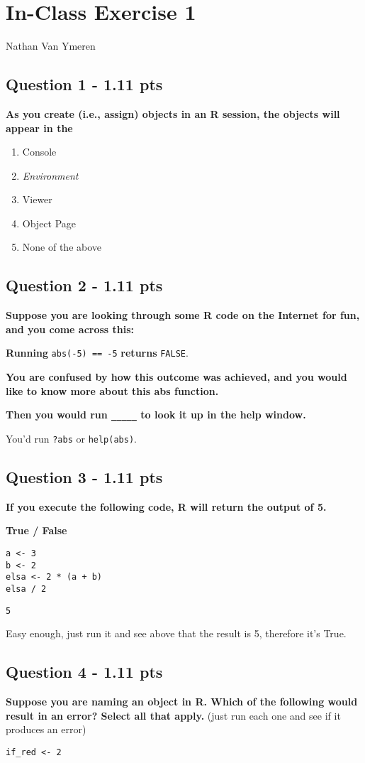 \documentclass[11pt]{article}
\author{Nathan Van Ymeren}
\date{\today}
\title{}
\begin{document}
\section*{In-Class Exercise 1}
\label{sec:org993d457}
Nathan Van Ymeren
\subsection*{Question 1 - 1.11 pts}
\label{sec:org1a52a24}
\textbf{As you create (i.e., assign) objects in an R session, the objects will appear in the}
\begin{enumerate}
\item Console
\item \emph{Environment}
\item Viewer
\item Object Page
\item None of the above
\end{enumerate}
\subsection*{Question 2 - 1.11 pts}
\label{sec:orgdc956fa}
\textbf{Suppose you are looking through some R code on the Internet for fun, and you come across this:}

\textbf{Running} \texttt{abs(-5) == -5} \textbf{returns} \texttt{FALSE}.

\textbf{You are confused by how this outcome was achieved, and you would like to know more about this abs function.}

\textbf{Then you would run \texttt{\_\_\_\_\_}  to look it up in the help window.}

You'd run \texttt{?abs} or \texttt{help(abs)}.
\subsection*{Question 3 - 1.11 pts}
\label{sec:orgeb3644c}
\textbf{If you execute the following code, R will return the output of 5.}

\textbf{True / False}

\begin{verbatim}
a <- 3
b <- 2
elsa <- 2 * (a + b)
elsa / 2
\end{verbatim}

\begin{verbatim}
5
\end{verbatim}


Easy enough, just run it and see above that the result is 5, therefore it's True.
\subsection*{Question 4 - 1.11 pts}
\label{sec:org7c0f2a6}
\textbf{Suppose you are naming an object in R. Which of the following would result in an error? Select all that apply.}
(just run each one and see if it produces an error)
\begin{verbatim}
if_red <- 2
\end{verbatim}
\end{document}
